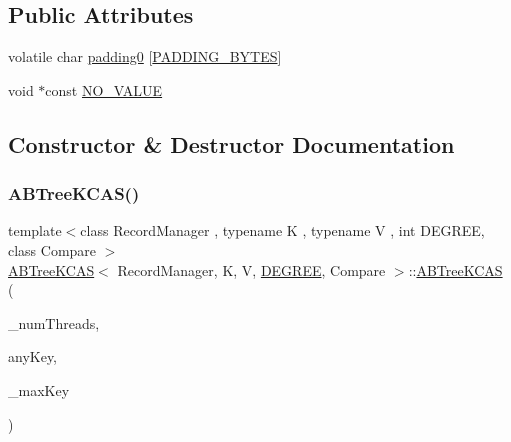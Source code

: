 \subsection*{Public Attributes}
\begin{DoxyCompactItemize}
\item 
volatile char \hyperlink{classABTreeKCAS_ab9a66f57523ef0e2fa3f0956b648b820}{padding0} \mbox{[}\hyperlink{skiplist_8h_a88585c3499d8f870798f19b81a3f41c9}{P\+A\+D\+D\+I\+N\+G\+\_\+\+B\+Y\+T\+ES}\mbox{]}
\item 
void $\ast$const \hyperlink{classABTreeKCAS_aa5896145408e8cc48a7dd620741a8f5d}{N\+O\+\_\+\+V\+A\+L\+UE}
\end{DoxyCompactItemize}


\subsection{Constructor \& Destructor Documentation}
\mbox{\label{classABTreeKCAS_a6aa4cca674313f303c0474e024bf2107}} 
\subsubsection{\texorpdfstring{A\+B\+Tree\+K\+C\+A\+S()}{ABTreeKCAS()}}
{\footnotesize\ttfamily template$<$class Record\+Manager , typename K , typename V , int D\+E\+G\+R\+EE, class Compare $>$ \\
\hyperlink{classABTreeKCAS}{A\+B\+Tree\+K\+C\+AS}$<$ Record\+Manager, K, V, \hyperlink{brown__sigouin__abtree__kcas_2adapter_8h_a5d88b17d70c985f2f2b8e987037fd6dd}{D\+E\+G\+R\+EE}, Compare $>$\+::\hyperlink{classABTreeKCAS}{A\+B\+Tree\+K\+C\+AS} (\begin{DoxyParamCaption}\item[{const int}]{\+\_\+num\+Threads,  }\item[{const K}]{any\+Key,  }\item[{const K}]{\+\_\+max\+Key }\end{DoxyParamCaption})}

\mbox{\label{classABTreeKCAS_adb05d6d43ab65e753362a01f3efaedd5}} 
